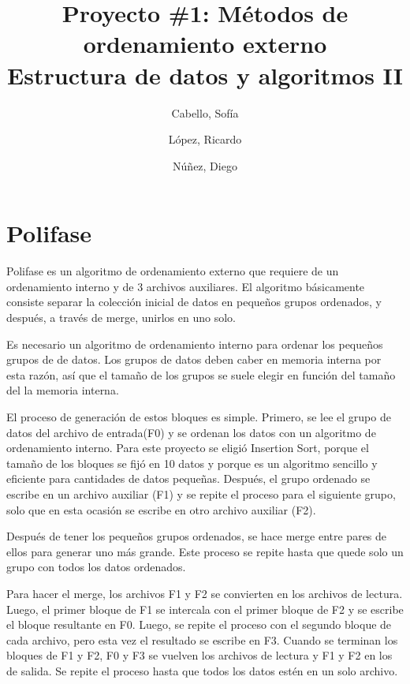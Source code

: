\documentclass[11pt]{article}
\title{Proyecto \#1: Métodos de ordenamiento externo \\
Estructura de datos y algoritmos II}
\author{Cabello, Sofía
\and López, Ricardo
\and Núñez, Diego}
\begin{document}
\maketitle{}

\section{Polifase}
Polifase es un algoritmo de ordenamiento externo que requiere de un ordenamiento interno y de 3 archivos auxiliares. El algoritmo básicamente consiste separar la colección inicial de datos en pequeños grupos ordenados, y después, a través de merge, unirlos en uno solo. 
\par
Es necesario un algoritmo de ordenamiento interno para ordenar los pequeños grupos de de datos. Los grupos de datos deben caber en memoria interna por esta razón, así que el tamaño de los grupos se suele elegir en función del tamaño del la memoria interna.
\par
El proceso de generación de estos bloques es simple. Primero, se lee el grupo de datos del archivo de entrada(F0) y se ordenan los datos con un algoritmo de ordenamiento interno. Para este proyecto se eligió Insertion Sort, porque el tamaño de los bloques se fijó en 10 datos y porque es un algoritmo sencillo y eficiente para cantidades de datos pequeñas. Después, el grupo ordenado se escribe en un archivo auxiliar (F1) y se repite el proceso para el siguiente grupo, solo que en esta ocasión se escribe en otro archivo auxiliar (F2).
 
\par 
Después de tener los pequeños grupos ordenados, se hace merge entre pares de ellos para generar uno más grande. Este proceso se repite hasta que quede solo un grupo con todos los datos ordenados.
\par
Para hacer el merge, los archivos F1 y F2 se convierten en los archivos de lectura. Luego, el primer bloque de F1 se intercala con el primer bloque de F2 y se escribe el bloque resultante en F0. Luego, se repite el proceso con el segundo bloque de cada archivo, pero esta vez el resultado se escribe en F3. Cuando se terminan los bloques de F1 y F2, F0 y F3 se vuelven los archivos de lectura y F1 y F2 en los de salida. Se repite el proceso hasta que todos los datos estén en un solo archivo.
\end{document}
